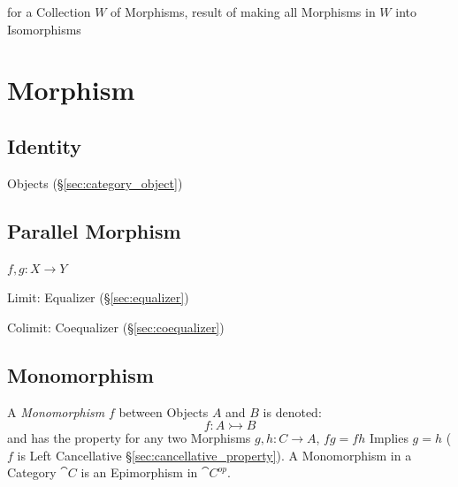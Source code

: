 for a Collection $W$ of Morphisms, result of making all Morphisms in
$W$ into Isomorphisms




\section{Morphism}\label{sec:morphism}

\subsection{Identity}\label{sec:identity_morphism}

Objects (\S\ref{sec:category_object})



\subsection{Parallel Morphism}\label{sec:parallel_morphism}

$f,g : X \rightarrow Y$

Limit: Equalizer (\S\ref{sec:equalizer})

Colimit: Coequalizer (\S\ref{sec:coequalizer})



\subsection{Monomorphism}\label{sec:monomorphism}

A \emph{Monomorphism} $f$ between Objects $A$ and $B$ is denoted:
\[
  f : A \rightarrowtail B
\]
and has the property for any two Morphisms $g, h : C \to A$, $fg = fh$ Implies
$g = h$ ($f$ is Left Cancellative \S\ref{sec:cancellative_property}). A
Monomorphism in a Category $\cat{C}$ is an Epimorphism in $\cat{C^{op}}$.

